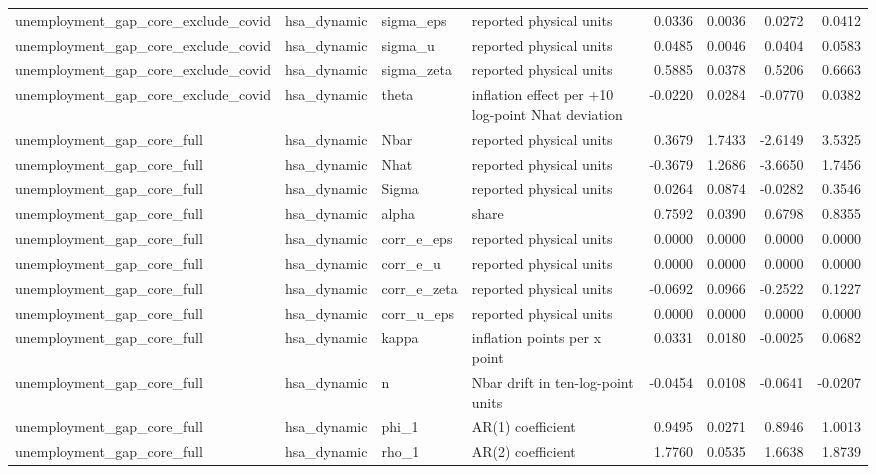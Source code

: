 \begin{tabular}{llllrrrr}
unemployment\_gap\_core\_exclude\_covid & hsa\_dynamic & sigma\_eps & reported physical units & 0.0336 & 0.0036 & 0.0272 & 0.0412 \\
unemployment\_gap\_core\_exclude\_covid & hsa\_dynamic & sigma\_u & reported physical units & 0.0485 & 0.0046 & 0.0404 & 0.0583 \\
unemployment\_gap\_core\_exclude\_covid & hsa\_dynamic & sigma\_zeta & reported physical units & 0.5885 & 0.0378 & 0.5206 & 0.6663 \\
unemployment\_gap\_core\_exclude\_covid & hsa\_dynamic & theta & inflation effect per +10 log-point Nhat deviation & -0.0220 & 0.0284 & -0.0770 & 0.0382 \\
unemployment\_gap\_core\_full & hsa\_dynamic & Nbar & reported physical units & 0.3679 & 1.7433 & -2.6149 & 3.5325 \\
unemployment\_gap\_core\_full & hsa\_dynamic & Nhat & reported physical units & -0.3679 & 1.2686 & -3.6650 & 1.7456 \\
unemployment\_gap\_core\_full & hsa\_dynamic & Sigma & reported physical units & 0.0264 & 0.0874 & -0.0282 & 0.3546 \\
unemployment\_gap\_core\_full & hsa\_dynamic & alpha & share & 0.7592 & 0.0390 & 0.6798 & 0.8355 \\
unemployment\_gap\_core\_full & hsa\_dynamic & corr\_e\_eps & reported physical units & 0.0000 & 0.0000 & 0.0000 & 0.0000 \\
unemployment\_gap\_core\_full & hsa\_dynamic & corr\_e\_u & reported physical units & 0.0000 & 0.0000 & 0.0000 & 0.0000 \\
unemployment\_gap\_core\_full & hsa\_dynamic & corr\_e\_zeta & reported physical units & -0.0692 & 0.0966 & -0.2522 & 0.1227 \\
unemployment\_gap\_core\_full & hsa\_dynamic & corr\_u\_eps & reported physical units & 0.0000 & 0.0000 & 0.0000 & 0.0000 \\
unemployment\_gap\_core\_full & hsa\_dynamic & kappa & inflation points per x point & 0.0331 & 0.0180 & -0.0025 & 0.0682 \\
unemployment\_gap\_core\_full & hsa\_dynamic & n & Nbar drift in ten-log-point units & -0.0454 & 0.0108 & -0.0641 & -0.0207 \\
unemployment\_gap\_core\_full & hsa\_dynamic & phi\_1 & AR(1) coefficient & 0.9495 & 0.0271 & 0.8946 & 1.0013 \\
unemployment\_gap\_core\_full & hsa\_dynamic & rho\_1 & AR(2) coefficient & 1.7760 & 0.0535 & 1.6638 & 1.8739 \\

\end{tabular}

